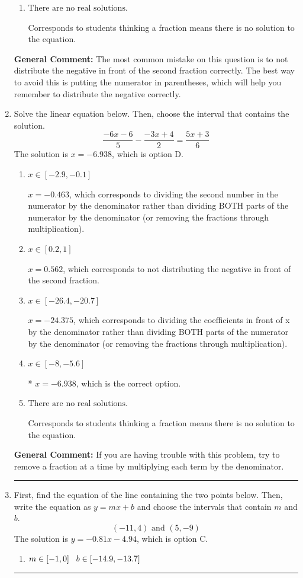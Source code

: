 \documentclass{extbook}[14pt]
\newcommand{\litem}[1]{\item #1

\rule{\textwidth}{0.4pt}}
\begin{document}
\begin{enumerate}
{\begin{enumerate}[label=\Alph*.]
$x = -4.222$, which corresponds to not distributing the negative in front of the first parentheses correctly.
\item \( \text{There are no real solutions.} \)

Corresponds to students thinking a fraction means there is no solution to the equation.
\end{enumerate}

\textbf{General Comment:} The most common mistake on this question is to not distribute the negative in front of the second fraction correctly. The best way to avoid this is putting the numerator in parentheses, which will help you remember to distribute the negative correctly.
}
\litem{
Solve the linear equation below. Then, choose the interval that contains the solution.
\[ \frac{-6x -6}{5} - \frac{-3x + 4}{2} = \frac{5x + 3}{6} \]The solution is \( x = -6.938 \), which is option D.\begin{enumerate}[label=\Alph*.]
\item \( x \in [-2.9, -0.1] \)

 $x = -0.463$, which corresponds to dividing the second number in the numerator by the denominator rather than dividing BOTH parts of the numerator by the denominator (or removing the fractions through multiplication).
\item \( x \in [0.2, 1] \)

 $x = 0.562$, which corresponds to not distributing the negative in front of the second fraction.
\item \( x \in [-26.4, -20.7] \)

 $x = -24.375$, which corresponds to dividing the coefficients in front of x by the denominator rather than dividing BOTH parts of the numerator by the denominator (or removing the fractions through multiplication).
\item \( x \in [-8, -5.6] \)

* $x = -6.938$, which is the correct option.
\item \( \text{There are no real solutions.} \)

Corresponds to students thinking a fraction means there is no solution to the equation.
\end{enumerate}

\textbf{General Comment:} If you are having trouble with this problem, try to remove a fraction at a time by multiplying each term by the denominator.
}
\litem{
First, find the equation of the line containing the two points below. Then, write the equation as $ y=mx+b $ and choose the intervals that contain $m$ and $b$.
\[ (-11, 4) \text{ and } (5, -9) \]The solution is \( y = -0.81x -4.94 \), which is option C.\begin{enumerate}[label=\Alph*.]
\item \( m \in [-1, 0] \hspace*{3mm} b \in [-14.9, -13.7] \)


\end{enumerate}}
\end{enumerate}
\end{document}
